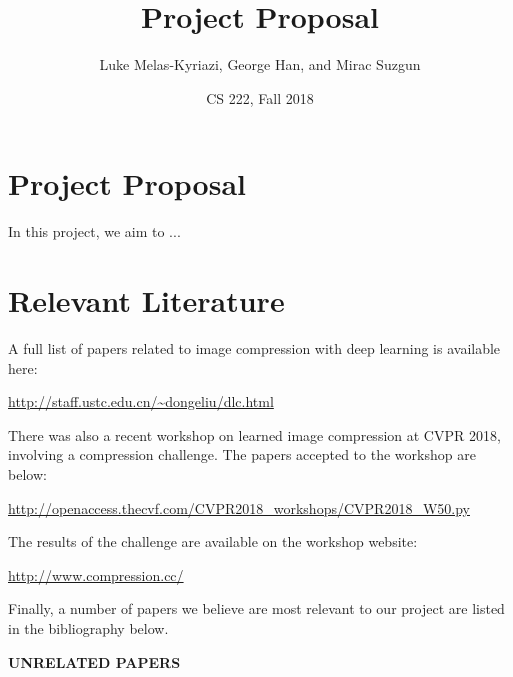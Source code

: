 \documentclass[11pt,letterpaper]{article}
\title{Project Proposal}
\author{Luke Melas-Kyriazi, George Han, and Mirac Suzgun}
\date{CS 222, Fall 2018}
\begin{document}
\maketitle

\section*{Project Proposal}

In this project, we aim to ... 


\section*{Relevant Literature}

A full list of papers related to image compression with deep learning is available here: 

\url{http://staff.ustc.edu.cn/~dongeliu/dlc.html}

There was also a recent workshop on learned image compression at CVPR 2018, involving a compression challenge. The papers accepted to the workshop are below: 

\url{http://openaccess.thecvf.com/CVPR2018_workshops/CVPR2018_W50.py}

The results of the challenge are available on the workshop website: 

\url{http://www.compression.cc/}

Finally, a number of papers we believe are most relevant to our project are listed in the bibliography below.  

\textbf{UNRELATED PAPERS}

\nocite{*}



\newpage
\end{document}
